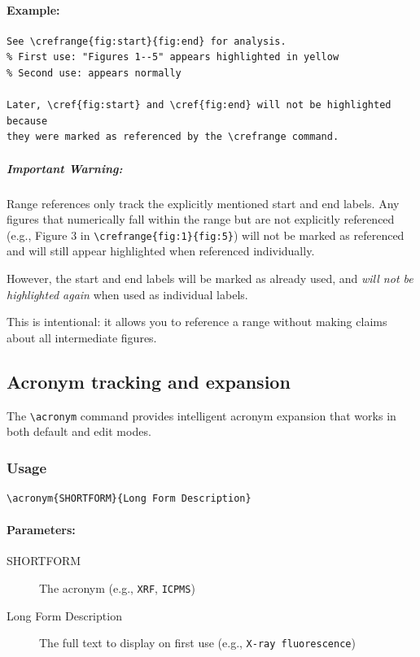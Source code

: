 \documentclass[11pt]{article}
\begin{document}
\paragraph{Example:}
\begin{verbatim}
See \crefrange{fig:start}{fig:end} for analysis.
% First use: "Figures 1--5" appears highlighted in yellow
% Second use: appears normally

Later, \cref{fig:start} and \cref{fig:end} will not be highlighted because
they were marked as referenced by the \crefrange command.
\end{verbatim}

\subparagraph*{Important Warning:}
Range references only track the explicitly mentioned start and end labels. 
Any figures that numerically fall within the range but are not explicitly referenced 
(e.g., Figure 3 in \verb|\crefrange{fig:1}{fig:5}|) 
will not be marked as referenced and will still appear highlighted when referenced individually.

However, the start and end labels will be marked as already used, and \emph{will not be highlighted again}
when used as individual labels.

This is intentional: it allows you to reference a range without making claims about all intermediate figures.

\subsection{Acronym tracking and expansion}

The \verb|\acronym| command provides intelligent acronym expansion that works in both default and edit modes.

\subsubsection{Usage}

\begin{verbatim}
\acronym{SHORTFORM}{Long Form Description}
\end{verbatim}

\paragraph{Parameters:}
\begin{description}
  \item[SHORTFORM] The acronym (e.g., \verb|XRF|, \verb|ICPMS|)
  \item[Long Form Description] The full text to display on first use 
    (e.g., \verb|X-ray fluorescence|)
\end{description}
\end{document}
